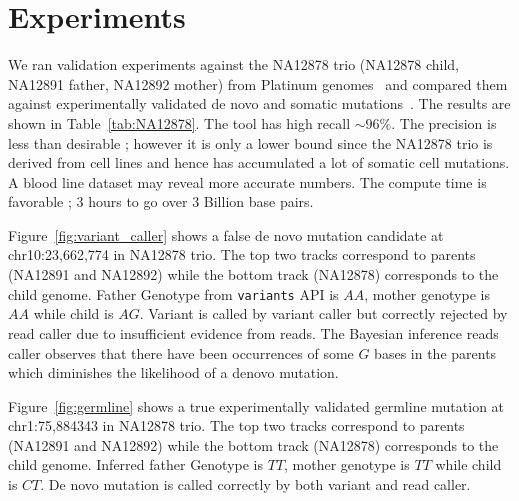 \documentclass{article}
\begin{document}
\section{Experiments}
\label{experiments}
We ran validation experiments against the NA12878 trio (NA12878 child, NA12891 father, NA12892 mother) from Platinum genomes~\cite{platinum} and compared them against experimentally validated de novo and somatic mutations~\cite{Conrad2011}. The results are shown in Table~\ref{tab:NA12878}. The tool has high recall $\sim 96\%$. The precision is less than desirable ; however it is only a lower bound since the NA12878 trio is derived from cell lines and hence has accumulated a lot of somatic cell mutations. A blood line dataset may reveal more accurate numbers. The compute time is favorable ; 3 hours to go over 3 Billion base pairs.

\vspace{1em}
Figure~\ref{fig:variant_caller} shows a false de novo mutation  candidate at chr10:23,662,774 in NA12878 trio. The top two tracks correspond to parents (NA12891 and NA12892) while the bottom track (NA12878) corresponds to the child genome. Father Genotype from \verb|variants| API is $AA$, mother genotype is $AA$ while child is $AG$. Variant is called by variant caller but correctly rejected by read caller due to insufficient evidence from reads. The Bayesian inference reads caller observes that there have been occurrences of some $G$ bases in the parents which diminishes the likelihood of a denovo mutation.

\vspace{1em}
Figure~\ref{fig:germline} shows a true experimentally validated germline mutation at chr1:75,884343 in NA12878 trio. The top two tracks correspond to parents (NA12891 and NA12892) while the bottom track (NA12878) corresponds to the child genome. Inferred father Genotype is $TT$, mother genotype is $TT$ while child is $CT$. De novo mutation is called correctly by both variant and read caller.
\end{document}
